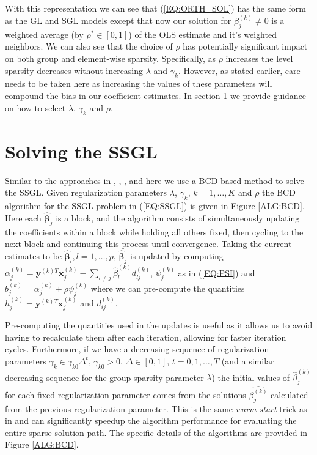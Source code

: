 \documentclass{article}
\numberwithin{equation}{section}
\theoremstyle{plain}
\newcommand{\bs}{\boldsymbol}
\begin{document}
With this representation we can see that (\ref{EQ:ORTH_SOL}) has the same form
as the GL and SGL models except that now our solution for $\beta_j^{(k)} \neq 0$
is a weighted average (by $\rho^{\ast} \in [0, 1]$) of the OLS estimate and it's
weighted neighbors. We can also see that the choice of $\rho$ has potentially
significant impact on both group and element-wise sparsity. Specifically, as
$\rho$ increases the level sparsity decreases without increasing $\lambda$ and
$\gamma_k$. However, as stated earlier, care needs to be taken here as
increasing the values of these parameters will compound the bias in our
coefficient estimates. In section \ref{SEC:SOL} we provide guidance on how
to select $\lambda$, $\gamma_k$ and $\rho$.


\section{Solving the SSGL}
\label{SEC:SOL}

Similar to the approaches in \cite{Liu2009}, \cite{fried007pco},
\cite{friedman2010note}, \cite{samarov2014splasso} and \cite{sgen2014} 
here we use a BCD based method to solve the SSGL.
Given regularization parameters $\lambda$, $\gamma_k$, $k = 1,\ldots,K$ and
$\rho$ the BCD algorithm for the SSGL problem in
(\ref{EQ:SSGL}) is given in Figure \ref{ALG:BCD}. Here each
$\hat{\bs\beta}_j$ is a block, and the algorithm consists of simultaneously
updating the coefficients within a block while holding all others fixed, then
cycling to the next block and continuing this process until convergence.
Taking the current estimates to be $\hat{\bs\beta}_l, l = 1,\ldots,p$,
$\hat{\bs\beta}_j$ is updated by computing $\alpha^{(k)}_j = \mathbf{y}^{(k)T}
\mathbf{x}_j^{(k)} - \sum_{l \neq j} \hat{\beta}_l^{(k)} d^{(k)}_{lj}$,
$\psi_j^{(k)}$ as in (\ref{EQ:PSI}) and $b_j^{(k)} = \alpha_j^{(k)} + \rho
\psi_j^{(k)}$ where we can pre-compute the quantities $h_j^{(k)} =
\mathbf{y}^{(k)T} \mathbf{x}^{(k)}_j$ and $d^{(k)}_{ij}$.

Pre-computing the quantities used in the updates is useful
as it allows us to avoid having to recalculate them after each iteration,
allowing for faster iteration cycles.
Furthermore, if we have a decreasing sequence of regularization parameters
$\gamma_k \in \gamma_{k0} \Delta^t$, $\gamma_{k0} > 0$, $\Delta \in [0, 1]$, $t
= 0, 1, \ldots, T$ (and a similar decreasing sequence for the group sparsity parameter
$\lambda$) the initial values of $\hat{\beta}_j^{(k)}$ for each fixed
regularization parameter comes from the solutions $\hat{\beta_j^{(k)}}$
calculated from the previous regularization parameter. This is the same {\it
warm start} trick as in \cite{fried007pco} and can significantly speedup the
algorithm performance for evaluating the entire sparse solution path. The
specific details of the algorithms are provided in Figure \ref{ALG:BCD}.
\end{document}
